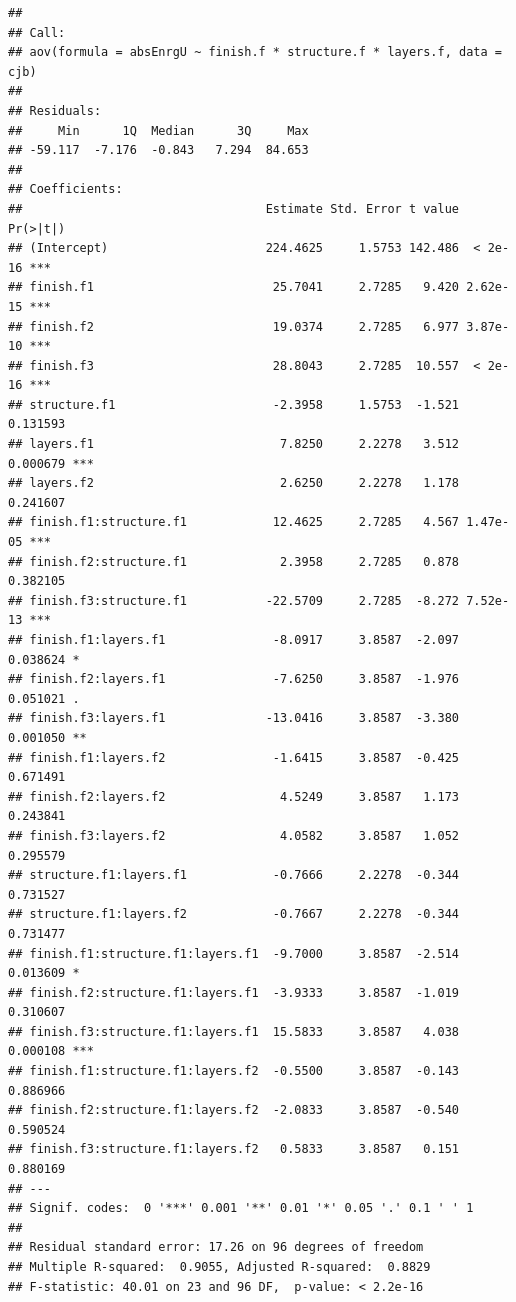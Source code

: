 \documentclass[
]{book}
\begin{document}
\begin{verbatim}
## 
## Call:
## aov(formula = absEnrgU ~ finish.f * structure.f * layers.f, data = cjb)
## 
## Residuals:
##     Min      1Q  Median      3Q     Max 
## -59.117  -7.176  -0.843   7.294  84.653 
## 
## Coefficients:
##                                  Estimate Std. Error t value Pr(>|t|)    
## (Intercept)                      224.4625     1.5753 142.486  < 2e-16 ***
## finish.f1                         25.7041     2.7285   9.420 2.62e-15 ***
## finish.f2                         19.0374     2.7285   6.977 3.87e-10 ***
## finish.f3                         28.8043     2.7285  10.557  < 2e-16 ***
## structure.f1                      -2.3958     1.5753  -1.521 0.131593    
## layers.f1                          7.8250     2.2278   3.512 0.000679 ***
## layers.f2                          2.6250     2.2278   1.178 0.241607    
## finish.f1:structure.f1            12.4625     2.7285   4.567 1.47e-05 ***
## finish.f2:structure.f1             2.3958     2.7285   0.878 0.382105    
## finish.f3:structure.f1           -22.5709     2.7285  -8.272 7.52e-13 ***
## finish.f1:layers.f1               -8.0917     3.8587  -2.097 0.038624 *  
## finish.f2:layers.f1               -7.6250     3.8587  -1.976 0.051021 .  
## finish.f3:layers.f1              -13.0416     3.8587  -3.380 0.001050 ** 
## finish.f1:layers.f2               -1.6415     3.8587  -0.425 0.671491    
## finish.f2:layers.f2                4.5249     3.8587   1.173 0.243841    
## finish.f3:layers.f2                4.0582     3.8587   1.052 0.295579    
## structure.f1:layers.f1            -0.7666     2.2278  -0.344 0.731527    
## structure.f1:layers.f2            -0.7667     2.2278  -0.344 0.731477    
## finish.f1:structure.f1:layers.f1  -9.7000     3.8587  -2.514 0.013609 *  
## finish.f2:structure.f1:layers.f1  -3.9333     3.8587  -1.019 0.310607    
## finish.f3:structure.f1:layers.f1  15.5833     3.8587   4.038 0.000108 ***
## finish.f1:structure.f1:layers.f2  -0.5500     3.8587  -0.143 0.886966    
## finish.f2:structure.f1:layers.f2  -2.0833     3.8587  -0.540 0.590524    
## finish.f3:structure.f1:layers.f2   0.5833     3.8587   0.151 0.880169    
## ---
## Signif. codes:  0 '***' 0.001 '**' 0.01 '*' 0.05 '.' 0.1 ' ' 1
## 
## Residual standard error: 17.26 on 96 degrees of freedom
## Multiple R-squared:  0.9055, Adjusted R-squared:  0.8829 
## F-statistic: 40.01 on 23 and 96 DF,  p-value: < 2.2e-16
\end{verbatim}
\end{document}
